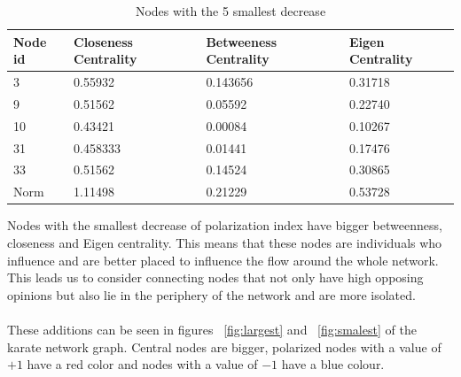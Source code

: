 \begin{table}[t]
 \centering
 \caption{Nodes with the 5 smallest decrease}
 \label{tab:nodesSmallest}
 \begin{tabular}{| l || l | l | l |}
 \hline
  Node id & Closeness Centrality& Betweeness Centrality & Eigen Centrality\\
  \hline
  \hline
  3 & 0.55932 & 0.143656 & 0.31718\\
  \hline
  9 & 0.51562 & 0.05592 & 0.22740\\
  \hline
  10 & 0.43421 & 0.00084 &  0.10267\\
  \hline
  31 & 0.458333 & 0.01441 & 0.17476\\
  \hline
  33 & 0.51562 & 0.14524 & 0.30865\\
  \hline
  \hline
    Norm & 1.11498 & 0.21229 & 0.53728\\ 
  \hline
 \end{tabular}
\end{table}


Nodes with the smallest decrease of polarization index have bigger betweenness, closeness and Eigen centrality. This means that these nodes are individuals who influence and are better placed to influence the flow around the whole network. This leads us to consider connecting nodes that not only have high opposing opinions but also lie in the periphery of the network and are more isolated. 
\\
\\
These additions can be seen in figures ~\ref{fig:largest} and ~\ref{fig:smalest} of the karate  network graph. Central nodes are bigger, polarized nodes with a value of $+1$ have a red color and nodes with a value of $-1$ have a blue colour.


